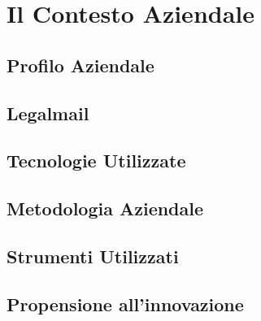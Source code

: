 
\chapter{Il Contesto Aziendale}
\label{cap:introduzione}
\section{Profilo Aziendale}
\label{sec:profilo-aziendale}

\section{Legalmail}
\label{sec:legal-mail}

\section{Tecnologie Utilizzate}
\label{sec:tecnologie-utilizzate}

\section{Metodologia Aziendale}
\label{sec:metodologia-aziendale}

\section{Strumenti Utilizzati}
\label{sec:strumenti-utilizzati}

\section{Propensione all'innovazione}
\label{sec:innovazione}
